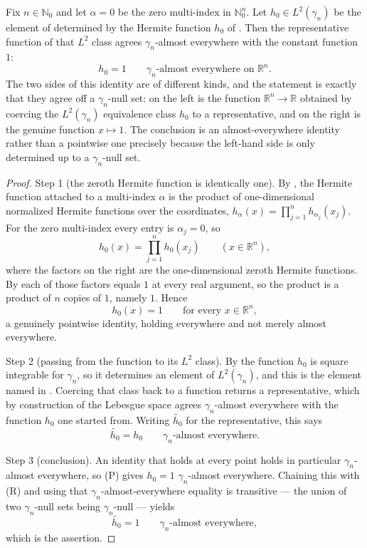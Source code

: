 \begin{lemma}
Fix $n \in \mathbb{N}_0$ and let $\alpha = 0$ be the zero multi-index in
$\mathbb{N}_0^n$.  Let $h_0 \in L^2(\gamma_n)$ be the element of
 determined by the Hermite function $h_0$ of
.  Then the representative function of that $L^2$ class
agrees $\gamma_n$-almost everywhere with the constant function $1$:
\[
  h_0 = 1 \qquad \gamma_n\text{-almost everywhere on } \mathbb{R}^n .
\]
The two sides of this identity are of different kinds, and the statement is
exactly that they agree off a $\gamma_n$-null set: on the left is the function
$\mathbb{R}^n \to \mathbb{R}$ obtained by coercing the $L^2(\gamma_n)$
equivalence class $h_0$ to a representative, and on the right is the genuine
function $x \mapsto 1$.  The conclusion is an almost-everywhere identity rather
than a pointwise one precisely because the left-hand side is only determined up
to a $\gamma_n$-null set.
\end{lemma}
\begin{proof}
Step 1 (the zeroth Hermite function is identically one).  By
, the Hermite function attached to a multi-index $\alpha$ is
the product of one-dimensional normalized Hermite functions over the
coordinates, $h_\alpha(x) = \prod_{j=1}^n h_{\alpha_j}(x_j)$.  For the zero
multi-index every entry is $\alpha_j = 0$, so
\[
  h_0(x) = \prod_{j=1}^n h_0(x_j) \qquad (x \in \mathbb{R}^n),
\]
where the factors on the right are the one-dimensional zeroth Hermite
functions.  By  each of those factors equals $1$ at every
real argument, so the product is a product of $n$ copies of $1$, namely $1$.
Hence
\[
  h_0(x) = 1 \qquad \text{for every } x \in \mathbb{R}^n , \tag{P}
\]
a genuinely pointwise identity, holding everywhere and not merely almost
everywhere.

Step 2 (passing from the function to its $L^2$ class).  By
 the function $h_0$ is square integrable for
$\gamma_n$, so it determines an element of $L^2(\gamma_n)$, and this is the
element named in .  Coercing that class back to a function
returns a representative, which by construction of the Lebesgue space agrees
$\gamma_n$-almost everywhere with the function $h_0$ one started from.  Writing
$\widetilde{h_0}$ for the representative, this says
\[
  \widetilde{h_0} = h_0 \qquad \gamma_n\text{-almost everywhere}. \tag{R}
\]

Step 3 (conclusion).  An identity that holds at every point holds in particular
$\gamma_n$-almost everywhere, so (P) gives
$h_0 = 1$ $\gamma_n$-almost everywhere.  Chaining this with (R) and using that
$\gamma_n$-almost-everywhere equality is transitive --- the union of two
$\gamma_n$-null sets being $\gamma_n$-null --- yields
\[
  \widetilde{h_0} = 1 \qquad \gamma_n\text{-almost everywhere},
\]
which is the assertion.
\end{proof}
